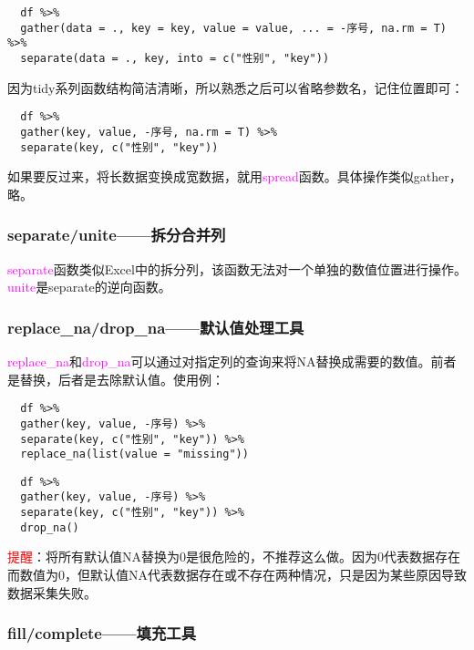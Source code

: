 \documentclass[cn,hazy,blue,14pt,screen]{elegantnote}
\begin{document}
\begin{lstlisting}
  df %>%
  gather(data = ., key = key, value = value, ... = -序号, na.rm = T) %>%
  separate(data = ., key, into = c("性别", "key"))
\end{lstlisting}

因为tidy系列函数结构简洁清晰，所以熟悉之后可以省略参数名，记住位置即可：

\begin{lstlisting}
  df %>%
  gather(key, value, -序号, na.rm = T) %>%
  separate(key, c("性别", "key"))
\end{lstlisting}

如果要反过来，将长数据变换成宽数据，就用\textcolor{magenta}{spread}函数。具体操作类似gather，略。

\subsubsection{separate/unite——拆分合并列}

\textcolor{magenta}{separate}函数类似Excel中的拆分列，该函数无法对一个单独的数值位置进行操作。\textcolor{magenta}{unite}是separate的逆向函数。

\subsubsection{replace\_na/drop\_na——默认值处理工具}

\textcolor{magenta}{replace\_na}和\textcolor{magenta}{drop\_na}可以通过对指定列的查询来将NA替换成需要的数值。前者是替换，后者是去除默认值。使用例：

\begin{lstlisting}
  df %>%
  gather(key, value, -序号) %>%
  separate(key, c("性别", "key")) %>%
  replace_na(list(value = "missing"))
\end{lstlisting}

\begin{lstlisting}
  df %>%
  gather(key, value, -序号) %>%
  separate(key, c("性别", "key")) %>%
  drop_na()  
\end{lstlisting}

\textcolor{red}{提醒}：将所有默认值NA替换为0是很危险的，不推荐这么做。因为0代表数据存在而数值为0，但默认值NA代表数据存在或不存在两种情况，只是因为某些原因导致数据采集失败。

\subsubsection{fill/complete——填充工具}
\end{document}
